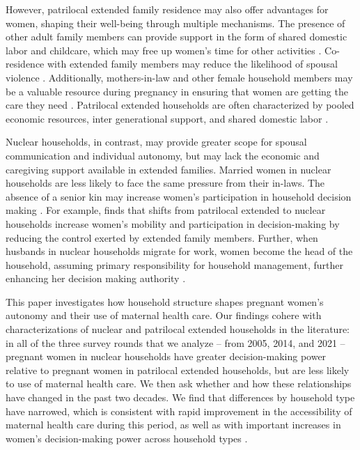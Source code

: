 \documentclass[12pt]{article}
\begin{document}
However, patrilocal extended family residence may also offer advantages for women, shaping their well-being through multiple mechanisms.  The presence of other adult family members can provide support in the form of shared domestic labor and childcare, which may free up women’s time for other activities \citep{khanna2024role}. Co-residence with extended family members may reduce the likelihood of spousal violence \citep{khanna2024role, allendorf2013going}. Additionally, mothers-in-law and other female household members may be a valuable resource during pregnancy in ensuring that women are getting the care they need \citep{varghese2019coresidence}.  Patrilocal extended households are often characterized by pooled economic resources, inter generational support, and shared domestic labor \citep{wadley1988karimpur}.  

Nuclear households, in contrast, may provide greater scope for spousal communication and individual autonomy, but may lack the economic and caregiving support available in extended families. Married women in nuclear households are less likely to face the same pressure from their in-laws. The absence of a senior kin may increase women’s participation in household decision making \citep{simkhada2010role,char2010influence}. For example, \cite{mookerjee2019gender} finds that shifts from patrilocal extended to nuclear households increase women’s mobility and participation in decision-making by reducing the control exerted by extended family members. Further, when husbands in nuclear households migrate for work, women become the head of the household, assuming primary responsibility for  household management, further enhancing her decision making authority \citep{desai2008negotiated}. 

This paper investigates how household structure shapes pregnant women's autonomy and their use of maternal health care.  Our findings cohere with characterizations of nuclear and patrilocal extended households in the literature: in all of the three survey rounds that we analyze -- from 2005, 2014, and 2021 -- pregnant women in nuclear households have greater decision-making power relative to pregnant women in patrilocal extended households, but are less likely to use of maternal health care.  We then ask whether and how these relationships have changed in the past two decades.  We find that differences by household type have narrowed, which is consistent with rapid improvement in the accessibility of maternal health care during this period, as well as with important increases in women's decision-making power across household types\citep{ram2026investigation, gandhi2022predictors, muralidharan2017cycling, rai2022use} .
\end{document}
